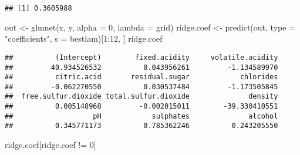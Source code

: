 \documentclass[
]{article}
\newenvironment{Shaded}{\begin{snugshade}}{\end{snugshade}}
\newcommand{\AttributeTok}[1]{\textcolor[rgb]{0.77,0.63,0.00}{#1}}
\newcommand{\DecValTok}[1]{\textcolor[rgb]{0.00,0.00,0.81}{#1}}
\newcommand{\FunctionTok}[1]{\textcolor[rgb]{0.00,0.00,0.00}{#1}}
\newcommand{\NormalTok}[1]{#1}
\newcommand{\OtherTok}[1]{\textcolor[rgb]{0.56,0.35,0.01}{#1}}
\newcommand{\SpecialCharTok}[1]{\textcolor[rgb]{0.00,0.00,0.00}{#1}}
\newcommand{\StringTok}[1]{\textcolor[rgb]{0.31,0.60,0.02}{#1}}
\begin{document}
\begin{Shaded}
\end{Shaded}

\begin{verbatim}
## [1] 0.3605988
\end{verbatim}

\begin{Shaded}
\begin{Highlighting}[]
\NormalTok{out }\OtherTok{\textless{}{-}} \FunctionTok{glmnet}\NormalTok{(x, y, }\AttributeTok{alpha =} \DecValTok{0}\NormalTok{, }\AttributeTok{lambda =}\NormalTok{ grid)}
\NormalTok{ridge.coef }\OtherTok{\textless{}{-}} \FunctionTok{predict}\NormalTok{(out, }\AttributeTok{type =} \StringTok{"coefficients"}\NormalTok{, }\AttributeTok{s =}\NormalTok{ bestlam)[}\DecValTok{1}\SpecialCharTok{:}\DecValTok{12}\NormalTok{, ]}
\NormalTok{ridge.coef}
\end{Highlighting}
\end{Shaded}

\begin{verbatim}
##          (Intercept)        fixed.acidity     volatile.acidity 
##         40.934526532          0.043956261         -1.134589970 
##          citric.acid       residual.sugar            chlorides 
##         -0.062270550          0.030537484         -1.173505845 
##  free.sulfur.dioxide total.sulfur.dioxide              density 
##          0.005148968         -0.002015011        -39.330410551 
##                   pH            sulphates              alcohol 
##          0.345771173          0.785362246          0.243205550
\end{verbatim}

\begin{Shaded}
\begin{Highlighting}[]
\NormalTok{ridge.coef[ridge.coef }\SpecialCharTok{!=} \DecValTok{0}\NormalTok{]}
\end{Highlighting}
\end{Shaded}
\end{document}
